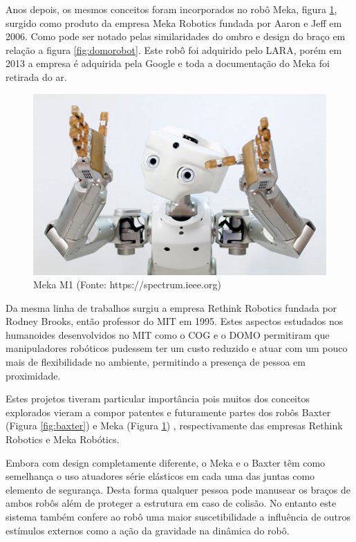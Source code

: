 Anos depois, os mesmos conceitos foram incorporados no robô Meka, figura \ref{fig:meka}, surgido como produto da empresa Meka Robotics fundada por Aaron e Jeff em 2006. Como pode ser notado pelas similaridades do ombro e design do braço em relação a figura \ref{fig:domorobot}. Este robô foi adquirido pelo LARA, porém em 2013 a empresa é adquirida pela Google e toda a documentação do Meka foi retirada do ar. 


\begin{figure}[H]
    \centering
    \includegraphics[width=0.6\linewidth]{tex/figs/meka-robot.png}
    \caption{Meka M1 (Fonte: https://spectrum.ieee.org)}
    \label{fig:meka}
\end{figure}

Da mesma linha de trabalhos surgiu a empresa Rethink Robotics fundada por Rodney Brooks, então professor do MIT em 1995. Estes aspectos estudados nos humanoides desenvolvidos no MIT como o COG e o DOMO permitiram que manipuladores robóticos pudessem ter um custo reduzido e atuar com um pouco mais de flexibilidade no ambiente, permitindo a presença de pessoa em proximidade.

Estes projetos tiveram particular importância pois muitos dos conceitos explorados vieram a compor patentes e futuramente partes dos robôs Baxter (Figura \ref{fig:baxter}) e Meka (Figura \ref{fig:meka}) , respectivamente das empresas Rethink Robotics e Meka Robótics. %

Embora com design completamente diferente, o Meka e o Baxter têm como semelhança o uso atuadores série elásticos em cada uma das juntas como elemento de segurança. Desta forma qualquer pessoa pode manusear os braços de ambos robôs além de proteger a estrutura em caso de colisão\cite{pratt1995series}. No entanto este sistema também confere ao robô uma maior suscetibilidade a influência de outros estímulos externos como a ação da gravidade na dinâmica do robô.


